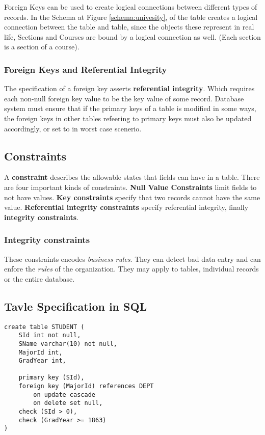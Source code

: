 \documentclass[11pt,a4paper,twocolumn]{book}
\begin{document}
Foreign Keys can be used to create logical connections between different types of records. In the Schema at Figure \ref{schema:univesity},  of the  table creates a logical connection between the  table and  table, since the objects these represent in real life, Sections and Courses are bound by a logical connection as well. (Each section is a section of a course).

\subsubsection{Foreign Keys and Referential Integrity}

The specification of a foreign key asserts \textbf{referential integrity}. Which requires each non-null foreign key value to be the key value of some record. Database system must ensure that if the primary keys of a table is modified in some ways, the foreign keys in other tables refeering to primary keys must also be updated accordingly, or set to  in worst case scenerio.

\subsection{Constraints}

A \textbf{constraint} describes the allowable states that fields can have in a table. There are four important kinds of constraints. \textbf{Null Value Constraints} limit fields to not have  values. \textbf{Key constraints} specify that two records cannot have the same value. \textbf{Referential integrity constraints} specify referential integrity, finally \textbf{integrity constraints}.

\subsubsection{Integrity constraints}

These constraints encodes \textit{business rules}. They can detect bad data entry and can enfore the \textit{rules} of the organization. They may apply to tables, individual records or the entire database.

\subsection{Tavle Specification in SQL}

\begin{lstlisting}[caption={the SQL specification of the STUDENT table},label={lst:student}]
create table STUDENT (
	SId int not null,
	SName varchar(10) not null,
	MajorId int,
	GradYear int,
	
	primary key (SId),
	foreign key (MajorId) references DEPT
		on update cascade
		on delete set null,
	check (SId > 0),
	check (GradYear >= 1863)
)
\end{lstlisting}
\end{document}
